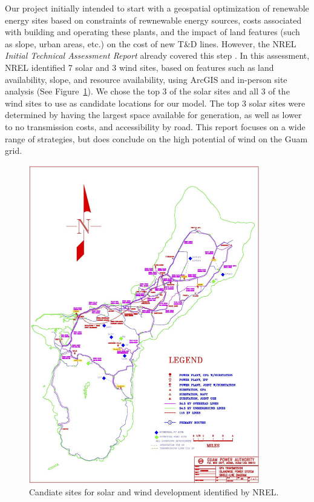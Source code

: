 \documentclass[12pt,letterpaper,fleqn]{article}
\begin{document}
Our project initially intended to start with a geospatial optimization
of renewable energy sites based on constraints of rewnewable energy
sources, costs associated with building and operating these plants,
and the impact of land features (such as slope, urban areas, etc.) on
the cost of new T\&D lines. However, the NREL \emph{Initial Technical
  Assessment Report} already covered this step \cite{misty}. In this
assessment, NREL identified 7 solar and 3 wind sites, based on
features such as land availability, slope, and resource availability,
using ArcGIS and in-person site analysis (See
Figure~\ref{fig:sites}). We chose the top 3 of the solar sites and all
3 of the wind sites to use as candidate locations for our model. The top 3 
solar sites were determined by having the largest space available for 
generation, as well as lower to no transmission costs, and accessibility
by road. This report focuses on a wide range of strategies, but does 
conclude on the high potential of wind on the Guam grid.

\begin{figure}[!h]
  \centering
  \includegraphics[width=0.9\textwidth]{img/sites}
  \caption{Candiate sites for solar and wind development identified by
    NREL.}
  \label{fig:sites}
\end{figure}
\end{document}
